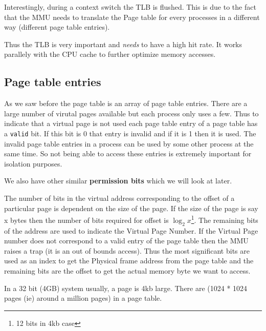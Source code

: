 \documentclass[12pt]{article}
\newcommand{\tbox}[1]{\noindent\fbox{\parbox{\textwidth}{#1}}}
\begin{document}
Interestingly, during a context switch the TLB is flushed. This is due to the fact that the MMU needs to translate the Page table for every processes in a different
way (different page table entries).


Thus the TLB is very important and \textit{needs} to have a high hit rate. It works 
parallely with the CPU cache to further optimize memory accesses.  
\\

\newpage
\noindent\tbox{
    \begin{center}
    \textbf{\Huge Lecture 14}\\
    \end{center}
}

\subsection*{Page table entries}
As we saw before the page table is an array of page table entries. 
There are a large number of virutal pages available but each process only uses a few. Thus to indicate that
a virtual page is not used each page table entry of a page table has a \texttt{valid} bit. If this bit is 0 that entry is invalid and if it is 1 then it is used. 
The invalid page table entries in a process can be used by some other process at the same time. So not being able to access these entries is extremely important for isolation purposes.

We also have other similar \textbf{permission bits} which we will look at later.

The number of bits in the virtual address corresponding to the offset of a particular page is dependent on the size of the page. 
If the size of the page is say x bytes then the number of bits required for offset is \(\log_{2} x\)\footnote{12 bits in 4kb case}. The remaining bits of the address are used to indicate the 
Virtual Page Number. If the Virtual Page number does not correspond to a valid entry of the page table then the MMU raises a trap (it is an out of bounds access). Thus the most significant bits are used as an index to get the Physical frame address from the 
page table and the remaining bits are the offset to get the actual memory byte we want to access. 

In a 32 bit (4GB) system usually, a page is 4kb large. There are (1024 * 1024 pages (ie) around a million pages) in a page table.
\end{document}
